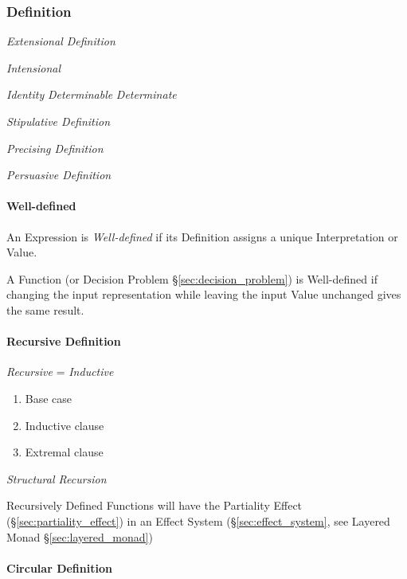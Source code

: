 \subsubsection{Definition}\label{sec:definition}

\emph{Extensional Definition}

\emph{Intensional}

\emph{Identity} \emph{Determinable} \emph{Determinate}

\emph{Stipulative Definition}

\emph{Precising Definition}

\emph{Persuasive Definition}



\paragraph{Well-defined}\label{sec:well_defined}\hfill

An Expression is \emph{Well-defined} if its Definition assigns a
unique Interpretation or Value.

A Function (or Decision Problem \S\ref{sec:decision_problem}) is
Well-defined if changing the input representation while leaving the
input Value unchanged gives the same result. %



\paragraph{Recursive Definition}\label{sec:recursive_definition}\hfill

\emph{Recursive} = \emph{Inductive}

\begin{enumerate}
    \item Base case
    \item Inductive clause
    \item Extremal clause
\end{enumerate}

\emph{Structural Recursion}

Recursively Defined Functions will have the Partiality Effect
(\S\ref{sec:partiality_effect}) in an Effect System
(\S\ref{sec:effect_system}, see Layered Monad
\S\ref{sec:layered_monad})



\paragraph{Circular Definition}\label{sec:circular_definition}\hfill

